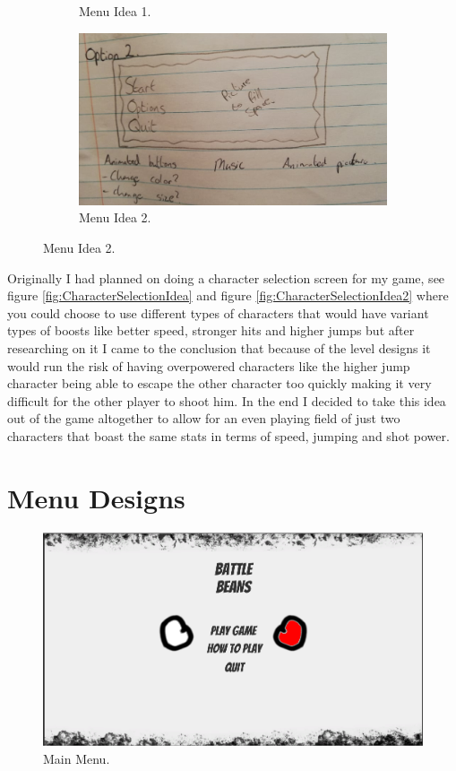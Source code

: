 \begin{figure}
\begin{subfigure}{.5\textwidth}
  \caption{Menu Idea 1.}
  \label{fig:MenuIdea1}
  \end{subfigure}%
\begin{subfigure}{.5\textwidth}
\centering
  \includegraphics[width= 1\linewidth]{Images/MenuIdea2.jpg}
  \caption{Menu Idea 2.}
  \label{fig:MenuIdea2}
  \end{subfigure}%
\end{figure}

\newpage
Originally I had planned on doing a character selection screen for my game, see figure \ref{fig:CharacterSelectionIdea} and figure \ref{fig:CharacterSelectionIdea2} where you could choose to use different types of characters that would have variant types of boosts like better speed, stronger hits and higher jumps but after researching on it I came to the conclusion that because of the level designs it would run the risk of having overpowered characters like the higher jump character being able to escape the other character too quickly making it very difficult for the other player to shoot him. In the end I decided to take this idea out of the game altogether to allow for an even playing field of just two characters that boast the same stats in terms of speed, jumping and shot power.

\section{Menu Designs}
\begin{figure}[h]
\centering
  \includegraphics[width= 0.8\linewidth]{Images/MainMenu.PNG}
  \caption{Main Menu.}
  \label{fig:Menu}
\end{figure}

